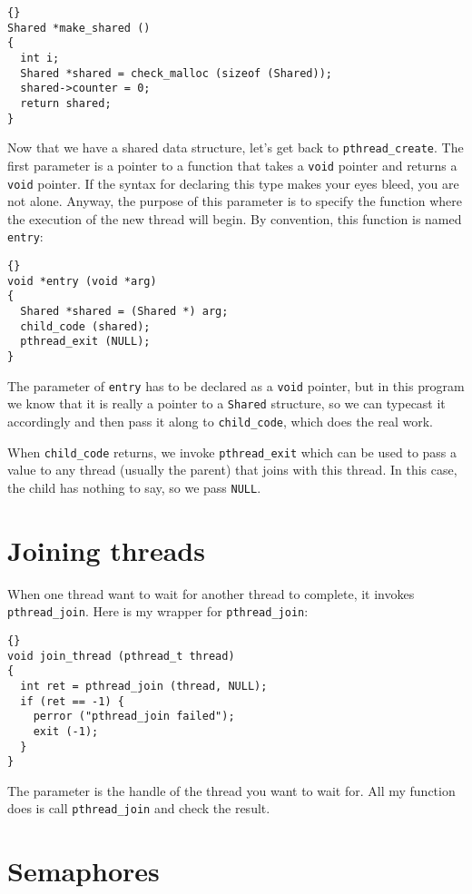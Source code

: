 \begin{lstlisting}[title={}]{}
Shared *make_shared ()
{
  int i;
  Shared *shared = check_malloc (sizeof (Shared));
  shared->counter = 0;
  return shared;
}
\end{lstlisting}

Now that we have a shared data structure, let's get back to
{\tt pthread\_create}.
The first parameter is a pointer to a function that takes
a {\tt void} pointer and returns a {\tt void} pointer.  If the syntax
for declaring this type makes your eyes bleed, you are not alone.
Anyway, the purpose of this parameter is to specify the function where
the execution of the new thread will begin.  By convention, this
function is named {\tt entry}:

\begin{lstlisting}[title={}]{}
void *entry (void *arg)
{
  Shared *shared = (Shared *) arg;
  child_code (shared);
  pthread_exit (NULL);
}
\end{lstlisting}

The parameter of {\tt entry} has to be declared as a {\tt void}
pointer, but in this program we know that it is really a pointer to a
{\tt Shared} structure, so we can typecast it accordingly and then
pass it along to {\tt child\_code}, which does the real work.

When {\tt child\_code} returns, we invoke {\tt pthread\_exit}
which can be used to pass a value to any thread (usually the
parent) that joins with this thread.  In this case, the child
has nothing to say, so we pass {\tt NULL}.


\section{Joining threads}

When one thread want to wait for another thread to complete,
it invokes {\tt pthread\_join}.
Here is my wrapper for {\tt pthread\_join}:

\begin{lstlisting}[title={}]{}
void join_thread (pthread_t thread)
{
  int ret = pthread_join (thread, NULL);
  if (ret == -1) {
    perror ("pthread_join failed");
    exit (-1);
  }
}
\end{lstlisting}

The parameter is the handle of the thread you want to wait for.
All my function does is call {\tt pthread\_join} and check the
result.


\section{Semaphores}

